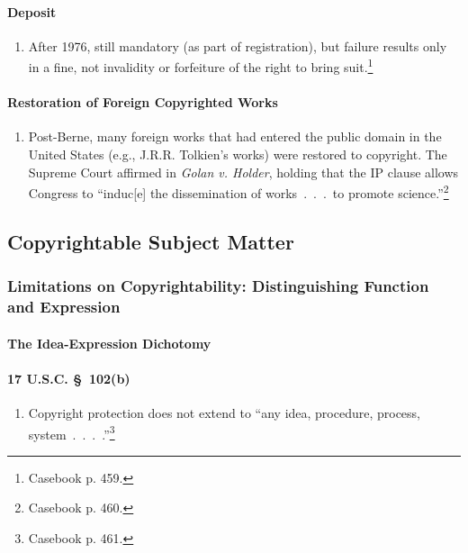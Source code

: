 \paragraph{Deposit}

\begin{enumerate}
    \item After 1976, still mandatory (as part of registration), but failure 
    results only in a fine, not invalidity or forfeiture of the right to bring 
    suit.\footnote{Casebook p.  459.}
\end{enumerate}

\paragraph{Restoration of Foreign Copyrighted Works}

\begin{enumerate}
    \item Post-Berne, many foreign works that had entered the public domain in 
    the United States (e.g., J.R.R. Tolkien's works) were restored to 
    copyright. The Supreme Court affirmed in \emph{Golan v. Holder}, holding 
    that the IP clause allows Congress to ``induc[e] the dissemination of 
    works~.~.~.~to promote science.''\footnote{Casebook p. 460.}
\end{enumerate}

\subsection{Copyrightable Subject Matter}

\subsubsection{Limitations on Copyrightability: Distinguishing Function and 
Expression}

\paragraph{The Idea-Expression Dichotomy}

\paragraph{17 U.S.C. \S\ 102(b)}

\begin{enumerate}
    \item Copyright protection does not extend to ``any idea, procedure, 
    process, system~.~.~.~.''\footnote{Casebook p. 461.}
\end{enumerate}

